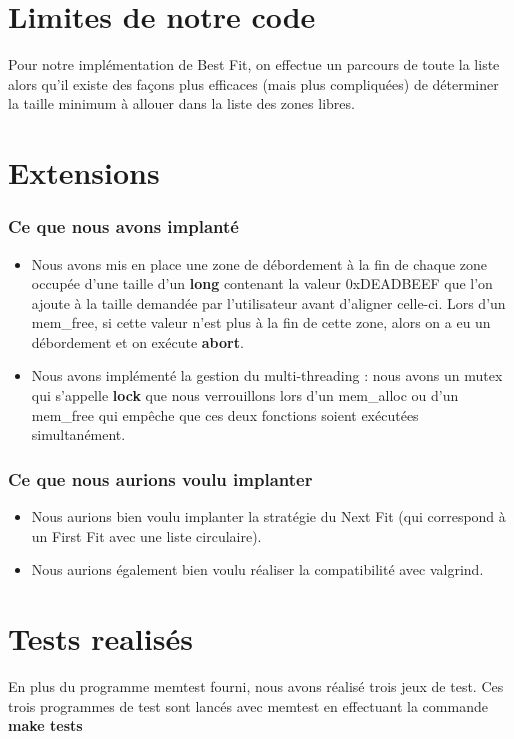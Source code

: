 \documentclass[10pt,a4paper]{article}
\begin{document}
\section{Limites de notre code}
	Pour notre implémentation de Best Fit, on effectue un parcours de toute la liste alors qu'il existe des façons plus efficaces (mais plus compliquées) de déterminer la taille minimum à allouer dans la liste des zones libres.
	
\section{Extensions}

\subsubsection*{Ce que nous avons implanté}
\begin{itemize}
	\item Nous avons mis en place une zone de débordement à la fin de chaque zone occupée d'une taille d'un \textbf{long} contenant la valeur 0xDEADBEEF que l'on ajoute à la taille demandée par l'utilisateur avant d'aligner celle-ci. Lors d'un mem\_free, si cette valeur n'est plus à la fin de cette zone, alors on a eu un débordement et on exécute \textbf{abort}.
	\item Nous avons implémenté la gestion du multi-threading : nous avons un mutex qui s'appelle \textbf{lock} que nous verrouillons lors d'un mem\_alloc ou d'un mem\_free qui empêche que ces deux fonctions soient exécutées simultanément.
\end{itemize}
\subsubsection*{Ce que nous aurions voulu implanter}
\begin{itemize}
	\item Nous aurions bien voulu implanter la stratégie du Next Fit (qui correspond à un First Fit avec une liste circulaire).
	\item Nous aurions également bien voulu réaliser la compatibilité avec valgrind.
\end{itemize}

\section{Tests realisés}
En plus du programme memtest fourni, nous avons réalisé trois jeux de test.
Ces trois programmes de test sont lancés avec memtest en effectuant la commande \textbf{make tests}
\end{document}
